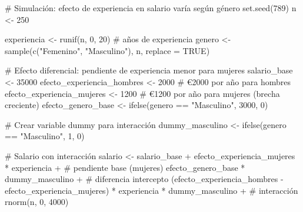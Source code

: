 \documentclass[
  letterpaper,
  DIV=11,
  numbers=noendperiod]{scrreprt}
\newenvironment{Shaded}{\begin{snugshade}}{\end{snugshade}}
\newcommand{\AttributeTok}[1]{\textcolor[rgb]{0.40,0.45,0.13}{#1}}
\newcommand{\CommentTok}[1]{\textcolor[rgb]{0.37,0.37,0.37}{#1}}
\newcommand{\ConstantTok}[1]{\textcolor[rgb]{0.56,0.35,0.01}{#1}}
\newcommand{\DecValTok}[1]{\textcolor[rgb]{0.68,0.00,0.00}{#1}}
\newcommand{\FunctionTok}[1]{\textcolor[rgb]{0.28,0.35,0.67}{#1}}
\newcommand{\NormalTok}[1]{\textcolor[rgb]{0.00,0.23,0.31}{#1}}
\newcommand{\OtherTok}[1]{\textcolor[rgb]{0.00,0.23,0.31}{#1}}
\newcommand{\SpecialCharTok}[1]{\textcolor[rgb]{0.37,0.37,0.37}{#1}}
\newcommand{\StringTok}[1]{\textcolor[rgb]{0.13,0.47,0.30}{#1}}
\begin{document}
\begin{tcolorbox}[enhanced jigsaw, leftrule=.75mm, breakable, colbacktitle=quarto-callout-tip-color!10!white, bottomrule=.15mm, colframe=quarto-callout-tip-color-frame, toprule=.15mm, colback=white, coltitle=black, bottomtitle=1mm, left=2mm, title=\textcolor{quarto-callout-tip-color}{\faLightbulb}\hspace{0.5em}{Ejemplo: Interacción experiencia-género en salarios}, opacityback=0, arc=.35mm, opacitybacktitle=0.6, toptitle=1mm, titlerule=0mm, rightrule=.15mm]

\begin{Shaded}
\begin{Highlighting}[]
\CommentTok{\# Simulación: efecto de experiencia en salario varía según género}
\FunctionTok{set.seed}\NormalTok{(}\DecValTok{789}\NormalTok{)}
\NormalTok{n }\OtherTok{\textless{}{-}} \DecValTok{250}

\NormalTok{experiencia }\OtherTok{\textless{}{-}} \FunctionTok{runif}\NormalTok{(n, }\DecValTok{0}\NormalTok{, }\DecValTok{20}\NormalTok{)  }\CommentTok{\# años de experiencia}
\NormalTok{genero }\OtherTok{\textless{}{-}} \FunctionTok{sample}\NormalTok{(}\FunctionTok{c}\NormalTok{(}\StringTok{"Femenino"}\NormalTok{, }\StringTok{"Masculino"}\NormalTok{), n, }\AttributeTok{replace =} \ConstantTok{TRUE}\NormalTok{)}

\CommentTok{\# Efecto diferencial: pendiente de experiencia menor para mujeres}
\NormalTok{salario\_base }\OtherTok{\textless{}{-}} \DecValTok{35000}
\NormalTok{efecto\_experiencia\_hombres }\OtherTok{\textless{}{-}} \DecValTok{2000}  \CommentTok{\# €2000 por año para hombres}
\NormalTok{efecto\_experiencia\_mujeres }\OtherTok{\textless{}{-}} \DecValTok{1200}  \CommentTok{\# €1200 por año para mujeres (brecha creciente)}
\NormalTok{efecto\_genero\_base }\OtherTok{\textless{}{-}} \FunctionTok{ifelse}\NormalTok{(genero }\SpecialCharTok{==} \StringTok{"Masculino"}\NormalTok{, }\DecValTok{3000}\NormalTok{, }\DecValTok{0}\NormalTok{)}

\CommentTok{\# Crear variable dummy para interacción}
\NormalTok{dummy\_masculino }\OtherTok{\textless{}{-}} \FunctionTok{ifelse}\NormalTok{(genero }\SpecialCharTok{==} \StringTok{"Masculino"}\NormalTok{, }\DecValTok{1}\NormalTok{, }\DecValTok{0}\NormalTok{)}

\CommentTok{\# Salario con interacción}
\NormalTok{salario }\OtherTok{\textless{}{-}}\NormalTok{ salario\_base }\SpecialCharTok{+} 
\NormalTok{           efecto\_experiencia\_mujeres }\SpecialCharTok{*}\NormalTok{ experiencia }\SpecialCharTok{+}  \CommentTok{\# pendiente base (mujeres)}
\NormalTok{           efecto\_genero\_base }\SpecialCharTok{*}\NormalTok{ dummy\_masculino }\SpecialCharTok{+}      \CommentTok{\# diferencia intercepto}
\NormalTok{           (efecto\_experiencia\_hombres }\SpecialCharTok{{-}}\NormalTok{ efecto\_experiencia\_mujeres) }\SpecialCharTok{*}\NormalTok{ experiencia }\SpecialCharTok{*}\NormalTok{ dummy\_masculino }\SpecialCharTok{+}  \CommentTok{\# interacción}
           \FunctionTok{rnorm}\NormalTok{(n, }\DecValTok{0}\NormalTok{, }\DecValTok{4000}\NormalTok{)}


\end{Highlighting}
\end{Shaded}
\end{tcolorbox}
\end{document}

